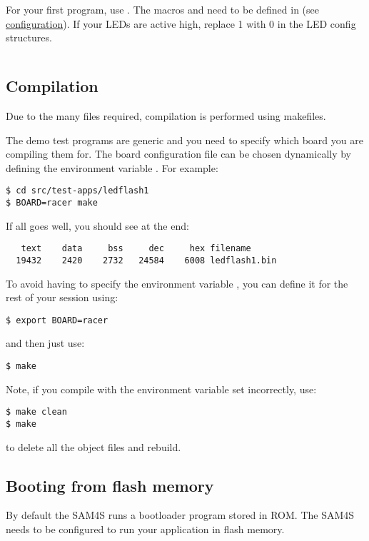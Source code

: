 For your first program, use
. The macros
 and  need to be defined in
 (see
\protect\hyperref[configuration]{configuration}). If your LEDs are
active high, replace 1 with 0 in the LED config structures.

\inputminted{C}{../../src/test-apps/ledflash1/ledflash1.c}

\subsection{Compilation}
\label{compilation}

Due to the many files required, compilation is performed using
makefiles.

The demo test programs are generic and you need to specify which board
you are compiling them for. The board configuration file can be chosen
dynamically by defining the environment variable . For
example:
%
\begin{verbatim}
$ cd src/test-apps/ledflash1
$ BOARD=racer make
\end{verbatim}

If all goes well, you should see at the end:
%
\begin{verbatim}
   text    data     bss     dec     hex filename
  19432    2420    2732   24584    6008 ledflash1.bin
\end{verbatim}

To avoid having to specify the environment variable , you
can define it for the rest of your session using:
%
\begin{verbatim}
$ export BOARD=racer
\end{verbatim}
%
and then just use:
%
\begin{verbatim}
$ make
\end{verbatim}

Note, if you compile with the  environment variable set incorrectly, use:
%
\begin{verbatim}
$ make clean
$ make  
\end{verbatim}
%
to delete all the object files and rebuild.


\subsection{Booting from flash memory}
\label{booting-from-flash-memory}

By default the SAM4S runs a bootloader program stored in ROM. The SAM4S
needs to be configured to run your application in flash memory.


